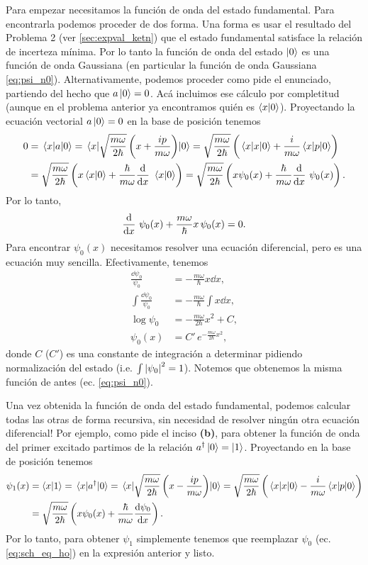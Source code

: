 \documentclass[10pt, a4paper]{article}
\newcommand{\aprefactsq}{\frac{m\omega}{2\hbar}}
\newcommand{\aprefact}{\sqrt{\aprefactsq}}
\numberwithin{equation}{subsection}
\begin{document}
\bigbreak

Para empezar necesitamos la función de onda del estado fundamental. Para
encontrarla podemos proceder de dos forma. Una forma es usar el resultado del
Problema 2 (ver \ref{sec:expval_ketn}) que el estado fundamental satisface la
relación de incerteza mínima. Por lo tanto la función de onda del estado
$\ket{0}$ es una función de onda Gaussiana (en particular la función de onda
Gaussiana \eqref{eq:psi_n0}). Alternativamente, podemos proceder como pide el
enunciado, partiendo del hecho que $a\ket{0} = 0$. Acá incluimos ese cálculo
por completitud (aunque en el problema anterior ya encontramos quién es
$\braket{x}{0}$). Proyectando la ecuación vectorial $a\ket{0} = 0$ en la base
de posición tenemos
\begin{align}
  0 &= \matrixel{x}{a}{0} = \matrixel{x}{\aprefact\left(x +
    \frac{ip}{m\omega}\right)}{0} = \aprefact\left(\matrixel{x}{x}{0} +
    \frac{i}{m\omega}\matrixel{x}{p}{0}\right) \nonumber \\
  &= \aprefact\left(x\braket{x}{0} + \frac{\hbar}{m\omega}\dv{x}\
    \braket{x}{0}\right) = \aprefact\left(x\psi_{0}(x) +
    \frac{\hbar}{m\omega}\dv{x}\ \psi_{0}(x)\right).
\end{align}
Por lo tanto,
\begin{equation}
  \dv{x}\ \psi_{0}(x) + \frac{m\omega}{\hbar} x\,\psi_{0}(x) = 0.
\end{equation}
Para encontrar $\psi_{0}(x)$ necesitamos resolver una ecuación diferencial,
pero es una ecuación muy sencilla. Efectivamente, tenemos
\begin{align}
  \frac{\dd{\psi_0}}{\psi_0} &= -\frac{m\omega}{\hbar}x\dd{x}, \\
  \int\frac{\dd{\psi_0}}{\psi_0} &= -\frac{m\omega}{\hbar}\int x\dd{x}, \\
  \log\psi_0 &= -\frac{m\omega}{2\hbar}x^2 + C, \\
  \psi_0(x) &= C'\,e^{-\frac{m\omega}{2\hbar}x^2},
\end{align}
donde $C$ ($C'$) es una constante de integración a determinar pidiendo
normalización del estado (i.e. $\int\abs{\psi_0}^2 = 1$). Notemos que obtenemos
la misma función de antes (ec.  \eqref{eq:psi_n0}).

\bigbreak

Una vez obtenida la función de onda del estado fundamental, podemos calcular
todas las otras de forma recursiva, sin necesidad de resolver ningún otra
ecuación diferencial! Por ejemplo, como pide el inciso \textbf{(b)}, para
obtener la función de onda del primer excitado partimos de la relación
$a^\dagger\ket{0} = \ket{1}$. Proyectando en la base de posición tenemos
\begin{align}
  \psi_{1}(x) &= \braket{x}{1} = \matrixel{x}{a^\dagger}{0} =
    \matrixel{x}{\aprefact\left(x - \frac{ip}{m\omega}\right)}{0} =
    \aprefact\left(\matrixel{x}{x}{0} -
    \frac{i}{m\omega}\matrixel{x}{p}{0}\right) \nonumber \\
  &= \aprefact\left(x\psi_{0}(x) + \frac{\hbar}{m\omega}\dv{\psi_0}{x}\right).
\end{align}
Por lo tanto, para obtener $\psi_1$ simplemente tenemos que reemplazar $\psi_0$
(ec. \eqref{eq:sch_eq_ho}) en la expresión anterior y listo.
\end{document}
